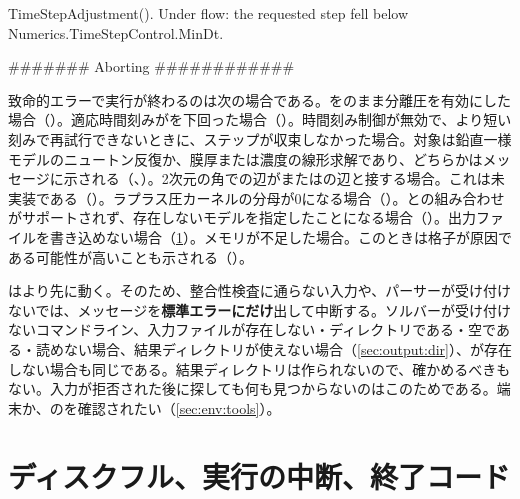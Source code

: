 \begin{plain}
TimeStepAdjustment(). Under flow: the requested step fell below Numerics.TimeStepControl.MinDt.

####### Aborting ############
\end{plain}

致命的エラーで実行が終わるのは次の場合である。をのまま分離圧を有効にした場合（）。適応時間刻みがを下回った場合（）。時間刻み制御が無効で、より短い刻みで再試行できないときに、ステップが収束しなかった場合。対象は鉛直一様モデルのニュートン反復か、膜厚または濃度の線形求解であり、どちらかはメッセージに示される（、）。2次元の角での辺がまたはの辺と接する場合。これは未実装である（）。ラプラス圧カーネルの分母が0になる場合（）。との組み合わせがサポートされず、存在しないモデルを指定したことになる場合（）。出力ファイルを書き込めない場合（\cref{sec:output:failures}）。メモリが不足した場合。このときは格子が原因である可能性が高いことも示される（）。

\begin{warn}[入力ファイルのエラーでは結果ディレクトリは残らない]
  はより先に動く。そのため、整合性検査に通らない入力や、パーサーが受け付けないでは、メッセージを\textbf{標準エラーにだけ}出して中断する。ソルバーが受け付けないコマンドライン、入力ファイルが存在しない・ディレクトリである・空である・読めない場合、結果ディレクトリが使えない場合（\cref{sec:output:dir}）、が存在しない場合も同じである。結果ディレクトリは作られないので、確かめるべきもない。入力が拒否された後に探しても何も見つからないのはこのためである。端末か、のを確認されたい（\cref{sec:env:tools}）。
\end{warn}

\section{ディスクフル、実行の中断、終了コード}
\label{sec:output:failures}

